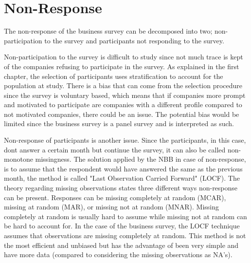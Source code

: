 \documentclass[12pt,a4paper,oneside]{book}
\begin{document}
\section{Non-Response}



The non-response of the business survey can be decomposed into two; non-participation to the survey and participants not responding to the survey.

Non-participation to the survey is difficult to study since not much trace is kept of the companies refusing to participate in the survey. As explained in the first chapter, the selection of participants uses stratification to account for the population at study.
There is a bias that can come from the selection procedure since the survey is voluntary based, which means that if companies more prompt and motivated to participate are companies with a different profile compared to not motivated companies, there could be an issue.
The potential bias would be limited since the business survey is a panel survey and is interpreted as such.

Non-response of participants is another issue. 
Since the participants, in this case, dont answer a certain month but continue the survey, it can also be called non-monotone missingness.
The solution applied by the NBB in case of non-response, is to assume that the respondent would have answered the same as the previous month, the method is called "Last Observation Carried Forward" (LOCF). 
The theory regarding missing observations states three different ways non-response can be present. Responses can be missing completely at random (MCAR), missing at random (MAR), or missing not at random (MNAR). Missing completely at random is usually hard to assume while missing not at random can be hard to account for.
In the case of the business survey, the LOCF technique assumes that observations are missing completely at random. This method is not the most efficient and unbiased but has the advantage of been very simple and have more data (compared to considering the missing observations as NA's). 
\end{document}
